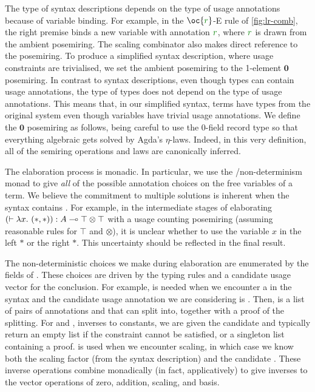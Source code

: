 The type of syntax descriptions depends on the type of usage annotations because
of variable binding.
For example, in the $\oc{\gr r}$-E rule of \cref{fig:lr-comb}, the right
premise binds a new variable with annotation $\gr r$, where $\gr r$ is drawn
from the ambient posemiring.
The scaling combinator also makes direct reference to the posemiring.
To produce a simplified syntax description, where usage constraints are
trivialised, we set the ambient posemiring to the 1-element $\mathbf0$
posemiring.
In contrast to syntax descriptions, even though types can contain usage
annotations, the type of types does not depend on the type of usage annotations.
This means that, in our simplified syntax, terms have types from the original
system even though variables have trivial usage annotations.
We define the $\mathbf0$ posemiring as follows, being careful to use the
0-field record type \AgdaRecord{$\top$} so that everything algebraic gets
solved by Agda's $\eta$-laws.
Indeed, in this very definition, all of the semiring operations and laws are
canonically inferred.


The elaboration process is monadic.
In particular, we use the /non-determinism monad to give
\emph{all} of the possible annotation choices on the free variables of a term.
We believe the commitment to multiple solutions is inherent when the syntax
contains .
For example, in the intermediate stages of elaborating
$\plr{\vdash \lambda x.~\plr{*,*}} : A \multimap \top \otimes \top$ with a
usage counting posemiring (assuming reasonable rules for $\top$ and $\otimes$),
it is unclear whether to use the variable $x$ in the left $*$ or the right $*$.
This uncertainty should be reflected in the final result.

The non-deterministic choices we make during elaboration are enumerated by
the fields of .
These choices are driven by the typing rules and a candidate usage vector for
the conclusion.
For example, \AgdaSpace{} is needed when we
encounter a  in the syntax and the candidate
usage annotation we are considering is .
Then, \AgdaSpace{} is a list of pairs of
annotations  and  that  can split into,
together with a proof of the splitting.
For  and , inverses to constants,
we are given the candidate  and typically return an empty list if
the constraint cannot be satisfied, or a singleton list containing a proof.
 is used when we encounter scaling, in which case we know
both the scaling factor  (from the syntax description) and the
candidate .
These inverse operations combine monadically (in fact, applicatively) to give
inverses to the vector operations of zero, addition, scaling, and basis.

